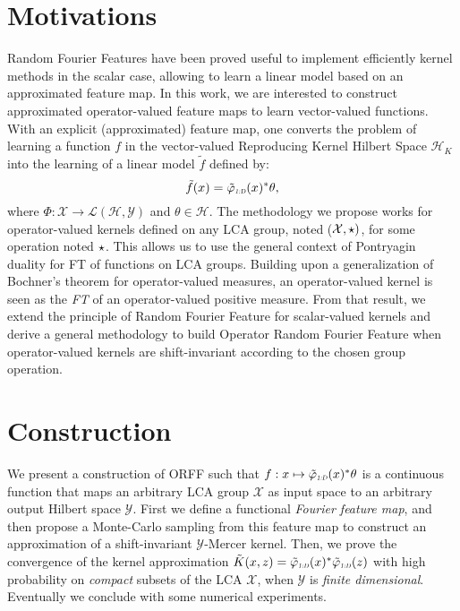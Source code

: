 \section{Motivations}
\label{sec:motivations}
Random Fourier Features have been proved useful to implement efficiently kernel methods in the scalar case, allowing to learn a linear model based on an approximated feature map. In this work, we are interested to construct approximated operator-valued feature maps to learn vector-valued functions. With an explicit (approximated) feature map, one converts the problem of learning a function $f$ in the vector-valued Reproducing Kernel Hilbert Space $\mathcal{H}_K$ into the learning of a linear model $\tilde{f}$ defined by:
 \begin{dmath*}
 \tilde{f}(x) = \tildePhi{1:D}(x)^* \theta,
 \end{dmath*}
 where $\Phi: \mathcal{X} \to \mathcal{L}(\mathcal{H},\mathcal{Y})$ and $\theta \in \mathcal{H}$. The methodology we propose works for operator-valued kernels defined on any \acf{LCA} group, noted ($\mathcal{X}, \star)$, for some operation noted $\star$. This allows us to use the general context of Pontryagin duality for \acl{FT} of functions on \acs{LCA} groups. Building upon a generalization of Bochner's theorem for operator-valued measures, an operator-valued kernel is seen as the \emph{\acl{FT}} of an operator-valued positive measure. From that result, we extend the principle of Random Fourier Feature for scalar-valued kernels and derive a general methodology to build Operator Random Fourier Feature when operator-valued kernels are shift-invariant according to the chosen group operation.

\clearpage
\section{Construction}
\label{sec:construction}
We present a construction of \acf{ORFF} such that $f: x\mapsto \tildePhi{1:D}(x)^*\theta$ is a continuous function that maps an arbitrary \acs{LCA} group $\mathcal{X}$ as input space to an arbitrary output Hilbert space $\mathcal{Y}$. First we define a functional \emph{Fourier feature map}, and then propose a Monte-Carlo sampling from this feature map to construct an approximation of a shift-invariant $\mathcal{Y}$-Mercer kernel.
Then, we prove the convergence of the kernel approximation $\tilde{K}(x,z)=\tildePhi{1:D}(x)^*\tildePhi{1:D}(z)$ with high probability on \emph{compact} subsets of the \acs{LCA} $\mathcal{X}$, when $\mathcal{Y}$ is \emph{finite dimensional}. Eventually we conclude with some numerical experiments.
